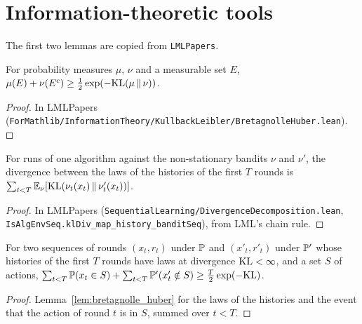 \chapter{Information-theoretic tools}
\label{chap:prereq_information}

The first two lemmas are copied from \texttt{LMLPapers}.

\begin{lemma}
  \label{lem:bretagnolle_huber}
  \leanok
  For probability measures $\mu$, $\nu$ and a measurable set $E$,
  $\mu(E) + \nu(E^c) \ge \frac12 \exp(-\mathrm{KL}(\mu \,\|\, \nu))$.
\end{lemma}

\begin{proof}
  \leanok
  In LMLPapers (\texttt{ForMathlib/InformationTheory/KullbackLeibler/BretagnolleHuber.lean}).
\end{proof}

\begin{lemma}
  \label{lem:divergence_decomposition_nonstationary}
  \leanok
  For runs of one algorithm against the non-stationary bandits $\nu$ and $\nu'$, the divergence
  between the laws of the histories of the first $T$ rounds is
  $\sum_{t < T} \mathbb{E}_\nu[\mathrm{KL}(\nu_t(x_t) \,\|\, \nu'_t(x_t))]$.
\end{lemma}

\begin{proof}
  \leanok
  In LMLPapers (\texttt{SequentialLearning/DivergenceDecomposition.lean},
  \texttt{IsAlgEnvSeq.klDiv\_map\_history\_banditSeq}), from LML's chain rule.
\end{proof}

\begin{lemma}
  \label{lem:bretagnolle_huber_actions}
  \leanok
  For two sequences of rounds $(x_t, r_t)$ under $\mathbb{P}$ and $(x'_t, r'_t)$ under $\mathbb{P}'$ whose
  histories of the first $T$ rounds have laws at divergence $\mathrm{KL} < \infty$, and a set $S$ of
  actions, $\sum_{t < T} \mathbb{P}(x_t \in S) + \sum_{t < T} \mathbb{P}'(x'_t \notin S) \ge
  \frac{T}{2} \exp(-\mathrm{KL})$.
\end{lemma}

\begin{proof}
  \leanok
  Lemma~\ref{lem:bretagnolle_huber} for the laws of the histories and the event that the action of
  round $t$ is in $S$, summed over $t < T$.
\end{proof}
